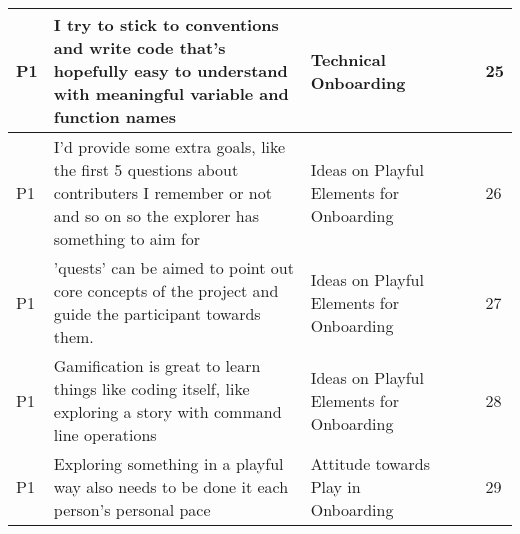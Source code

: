 \begin{appendices}
\begin{landscape}
\begin{longtable}{|p{0.8cm}|p{7cm}|p{3cm}|p{3cm}|p{5.5cm}|p{0.5cm}|}
      P1                   & I try to stick to conventions and write code that's hopefully easy to understand with meaningful variable and function names                                                                                                                                                & Technical Onboarding                     &                                    &                                                                                                                                                    & 25           \\ \hline
      P1                   & I'd provide some extra goals, like the first 5 questions about contributers I remember or not and so on so the explorer has something to aim for                                                                                                                            & Ideas on Playful Elements for Onboarding &                                    &                                                                                                                                                    & 26           \\ \hline
      P1                   & 'quests' can be aimed to point out core concepts of the project and guide the participant towards them.                                                                                                                                                                     & Ideas on Playful Elements for Onboarding &                                    &                                                                                                                                                    & 27           \\ \hline
      P1                   & Gamification is great to learn things like coding itself, like exploring a story with command line operations                                                                                                                                                               & Ideas on Playful Elements for Onboarding &                                    &                                                                                                                                                    & 28           \\ \hline
      P1                   & Exploring something in a playful way also needs to be done it each person's personal pace                                                                                                                                                                                   & Attitude towards Play in Onboarding      &                                    &                                                                                                                                                    & 29           \\ \hline

\end{longtable}
\end{landscape}
\end{appendices}

